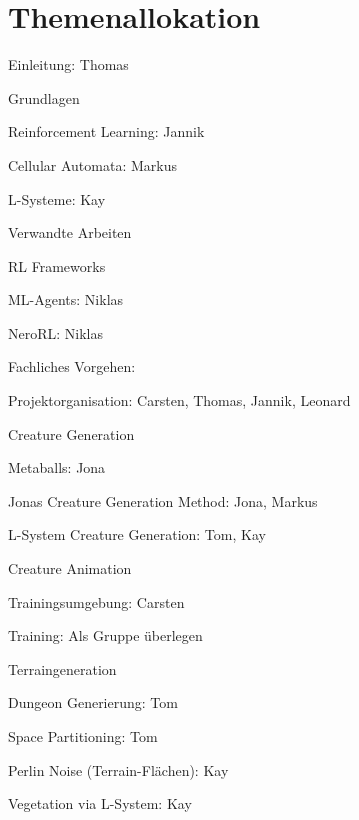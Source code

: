 \chapter*{Themenallokation}

\begin{thallok}
	\item Einleitung: Thomas
	\item Grundlagen
	\begin{thallok}
		\item Reinforcement Learning: Jannik
		\item Cellular Automata: Markus
		\item L-Systeme: Kay
	\end{thallok}
	\item Verwandte Arbeiten
	\begin{thallok}
		\item RL Frameworks
		\begin{thallok}
			\item ML-Agents: Niklas
			\item NeroRL: Niklas
		\end{thallok}
	\end{thallok}
	\item Fachliches Vorgehen:
	\begin{thallok}
		\item Projektorganisation: Carsten, Thomas, Jannik, Leonard
		\item Creature Generation
		\begin{thallok}
			\item Metaballs: Jona
			\item Jonas Creature Generation Method: Jona, Markus
			\item L-System Creature Generation: Tom, Kay
		\end{thallok}
		\item Creature Animation
		\begin{thallok}
			\item Trainingsumgebung: Carsten
			\item Training: Als Gruppe überlegen
		\end{thallok}
		\item Terraingeneration
		\begin{thallok}
			\item Dungeon Generierung: Tom
			\item Space Partitioning: Tom
			\item Perlin Noise (Terrain-Flächen): Kay
			\item Vegetation via L-System: Kay

\end{thallok}
\end{thallok}
\end{thallok}
